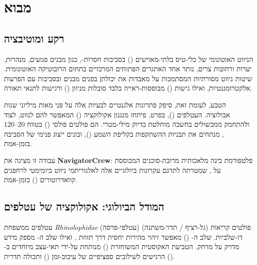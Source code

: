 

\section{מבוא}
\label{sec:intro}

\subsection{רקע ומוטיבציה}
\label{subsec:background}

הניווט האוטונומי של כלי-טיס בלתי-מאוישים ()
בסביבות חסרות-, כגון מבנים פגועים, מנהרות, יערות ורחובות צרים,
נותר אחד האתגרים הפתוחים המרכזיים בתחום הרובוטיקה האוטונומית.
שיטות ניווט מסורתיות המסתמכות על  מאבדות את יכולתן בפנים מבנים
ובסביבות עם הפרעות אלקטרומגנטיות, ואילו גישות 
() מבוססות-ראייה בלבד
סובלות מניוון () ורגישות לתנאי תאורה. \cite{Thrun2005ProbRobotics}

הטבע, לעומת זאת, סיפק פתרונות אלגנטיים לבעיות אלה על פני מאות מיליוני שנות אבולוציה.
העטלפים (), בפרט, פיתחו מנגנון אקולוקציה
() המאפשר להם לנווט, לצוד ולהתחמק ממכשולים
בחשכה מוחלטת בדיוק מילי-מטרי.
הם פולטים פולסי  () בטווח 20–120 ,
מנתחים את תבניות ההשתקפות בקליפת השמע (),
ובונים ייצוג פנימי של הסביבה בזמן-אמת. \cite{GriffithBatEcholocation}

עבודה זו מציגה את \textbf{NavigatorCrew}: פלטפורמת בינה מלאכותית
מרובת-סוכנים המבוססת על  \cite{CrewAIDocs},
שמטרתה לתרגם עקרונות ביולוגיים אלה לאלגוריתמי ניווט ביומימטי
לרחפנים קוואדרוטורים () בזמן-אמת.

\subsection{המודל הביולוגי: אקולוקציה של עטלפים}
\label{subsec:bat_bio}

עטלפים ממשפחת \textit{Rhinolophidae} (עטלפי-פרסה) פולטים קריאות
 (גל-רציף / תדר-משתנה) דו-שלביות.
שלב ה- () מאפשר זיהוי מהירות יחסית
דרך תזוזת , ואילו שלב ה- מספק מידע מדויק על מרחק.
הטביעת האקוסטית המשוחזרת () מנותחת
על-ידי תאי-עצב מיוחדים ב-
הרגישים לשילובים ספציפיים של עיכוב-זמן ()
ותכולה תדרית (). \cite{Simmons1979BatSonar}

